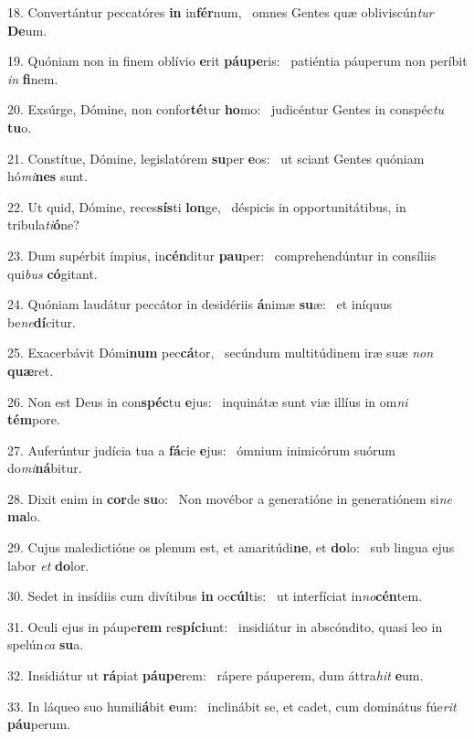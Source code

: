 18. Convertántur peccatóres \textbf{in} in\textbf{fér}num, \ast\  omnes Gentes quæ obliviscún\textit{tur} \textbf{De}um.\

19. Quóniam non in finem oblívio \textbf{e}rit \textbf{páu}\textbf{pe}ris: \ast\  patiéntia páuperum non períbit \textit{in} \textbf{fi}nem.\

20. Exsúrge, Dómine, non confor\textbf{té}tur \textbf{ho}mo: \ast\  judicéntur Gentes in conspéc\textit{tu} \textbf{tu}o.\

21. Constítue, Dómine, legislatórem \textbf{su}per \textbf{e}os: \ast\  ut sciant Gentes quóniam hó\textit{mi}\textbf{nes} sunt.\

22. Ut quid, Dómine, reces\textbf{sís}ti \textbf{lon}ge, \ast\  déspicis in opportunitátibus, in tribula\textit{ti}\textbf{ó}ne?\

23. Dum supérbit ímpius, in\textbf{cén}ditur \textbf{pau}per: \ast\  comprehendúntur in consíliis qui\textit{bus} \textbf{có}gitant.\

24. Quóniam laudátur peccátor in desidériis \textbf{á}nimæ \textbf{su}æ: \ast\  et iníquus be\textit{ne}\textbf{dí}citur.\

25. Exacerbávit Dómi\textbf{num} pec\textbf{cá}tor, \ast\  secúndum multitúdinem iræ suæ \textit{non} \textbf{quæ}ret.\

26. Non est Deus in con\textbf{spéc}tu \textbf{e}jus: \ast\  inquinátæ sunt viæ illíus in om\textit{ni} \textbf{tém}pore.\

27. Auferúntur judícia tua a \textbf{fá}cie \textbf{e}jus: \ast\  ómnium inimicórum suórum do\textit{mi}\textbf{ná}bitur.\

28. Dixit enim in \textbf{cor}de \textbf{su}o: \ast\  Non movébor a generatióne in generatiónem si\textit{ne} \textbf{ma}lo.\

29. Cujus maledictióne os plenum est, et amaritúdi\textbf{ne}, et \textbf{do}lo: \ast\  sub lingua ejus labor \textit{et} \textbf{do}lor.\

30. Sedet in insídiis cum divítibus \textbf{in} oc\textbf{cúl}tis: \ast\  ut interfíciat in\textit{no}\textbf{cén}tem.\

31. Oculi ejus in páupe\textbf{rem} re\textbf{spí}\textbf{ci}unt: \ast\  insidiátur in abscóndito, quasi leo in spelún\textit{ca} \textbf{su}a.\

32. Insidiátur ut \textbf{rá}piat \textbf{páu}\textbf{pe}rem: \ast\  rápere páuperem, dum áttra\textit{hit} \textbf{e}um.\

33. In láqueo suo humili\textbf{á}bit \textbf{e}um: \ast\  inclinábit se, et cadet, cum dominátus fúe\textit{rit} \textbf{páu}perum.\

